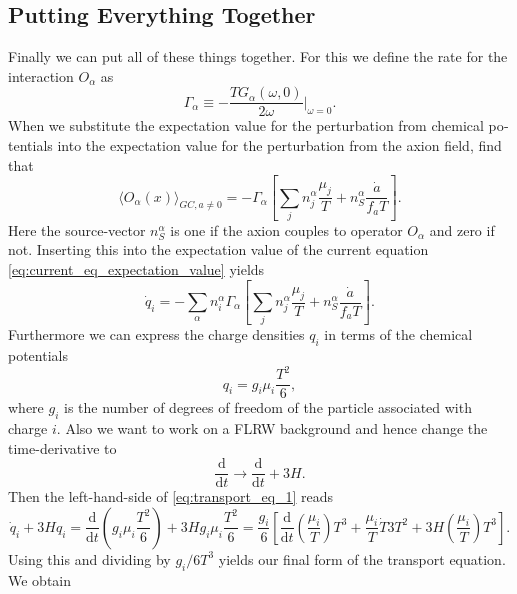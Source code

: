 \documentclass[master,       %
               twoside,        %
               BCOR10mm,       %
               english,ngerman, %
               ]{GAUBM}
\begin{document}
\begin{otherlanguage}{english}
\subsection{Putting Everything Together}
Finally we can put all of these things together.
For this we define the rate for the interaction $O_\alpha$ as
\begin{equation}
	\Gamma_\alpha \equiv - \frac{T G_\alpha(\omega, 0)}{2\omega} \Big|_{\omega = 0}.
\end{equation}
When we substitute the expectation value for the perturbation from chemical potentials into the expectation value for the perturbation from the axion field, find that
\begin{equation}
	\langle O_\alpha(x) \rangle_{GC, a \ne 0} = - \Gamma_\alpha \left[ \sum_j n_j^\alpha \frac{\mu_j}{T} + n_S^\alpha \frac{\dot{a}}{f_a T} \right].
\end{equation}
Here the source-vector $n_S^\alpha$ is one if the axion couples to operator $O_\alpha$ and zero if not.
Inserting this into the expectation value of the current equation \eqref{eq:current_eq_expectation_value} yields
\begin{equation}
	\label{eq:transport_eq_1}
	\dot{q}_i = - \sum_\alpha n^\alpha_i \Gamma_\alpha \left[ \sum_j n_j^\alpha \frac{\mu_j}{T} + n_S^\alpha \frac{\dot{a}}{f_a T} \right].
\end{equation}
Furthermore we can express the charge densities $q_i$ in terms of the chemical potentials
\begin{equation}
	q_i = g_i \mu_i \frac{T^2}{6},
\end{equation}
where $g_i$ is the number of degrees of freedom of the particle associated with charge $i$.
Also we want to work on a FLRW background and hence change the time-derivative to
\begin{equation}
	\frac{\mathrm{d}}{\mathrm{d} t} \to \frac{\mathrm{d}}{\mathrm{d} t} + 3 H.
\end{equation}
Then the left-hand-side of \eqref{eq:transport_eq_1} reads
\begin{equation}
	\dot{q}_i + 3 H q_i = \frac{\mathrm{d}}{\mathrm{d} t} \left( g_i \mu_i \frac{T^2}{6} \right) + 3 H g_i \mu_i \frac{T^2}{6} = \frac{g_i}{6} \left[ \frac{\mathrm{d}}{\mathrm{d} t} \left( \frac{\mu_i}{T} \right) T^3 + \frac{\mu_i}{T} \dot{T} 3 T^2 + 3 H \left( \frac{\mu_i}{T} \right) T^3 \right].
\end{equation}
Using this and dividing by $g_i / 6 T^3$ yields our final form of the transport equation. We obtain
\begin{equation}

\end{equation}
\end{otherlanguage}
\end{document}
